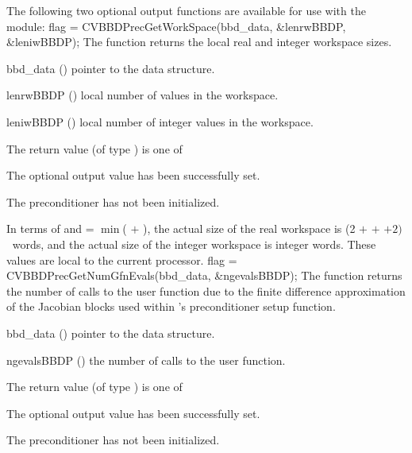 The following two optional output functions are available for use with
the {\cvbbdpre} module:
{
  flag = CVBBDPrecGetWorkSpace(bbd\_data, \&lenrwBBDP, \&leniwBBDP);
}
{
  The function  returns the local
  {\cvbbdpre} real and integer workspace sizes.
}
{
  \begin{args}[lenrwBBDP]
  \item[bbd\_data] ()
    pointer to the {\cvbbdpre} data structure.
  \item[lenrwBBDP] ()
    local number of  values in the {\cvbbdpre} workspace.
  \item[leniwBBDP] ()
    local number of integer values in the {\cvbbdpre} workspace.
  \end{args}
}
{
  The return value  (of type ) is one of
  \begin{args}
  \item[\Id{CV\_SUCCESS}] 
    The optional output value has been successfully set.
  \item[\Id{CV\_PDATA\_NULL}]
    The {\cvbbdpre} preconditioner has not been initialized.
  \end{args}
}
{
  In terms of  and
   = $\min$( $+$ ),
  the actual size of the real workspace is
  (2  $+$  $+$  $+2) \, $ $~$
   words, and the actual size of the integer workspace is
   integer words.  These values are local to the current processor.
}
{
  flag = CVBBDPrecGetNumGfnEvals(bbd\_data, \&ngevalsBBDP);
}
{
  The function  returns the
  number of calls to the user  function due to the 
  finite difference approximation of the Jacobian blocks used within
  {\cvbbdpre}'s preconditioner setup function.
}
{
  \begin{args}[ngevalsBBDP]
  \item[bbd\_data] ()
    pointer to the {\cvbbdpre} data structure.
  \item[ngevalsBBDP] ()
    the number of calls to the user  function.
  \end{args}
}
{
  The return value  (of type ) is one of
  \begin{args}
  \item[\Id{CV\_SUCCESS}] 
    The optional output value has been successfully set.
  \item[\Id{CV\_PDATA\_NULL}]
    The {\cvbbdpre} preconditioner has not been initialized.
  \end{args}
}
{}

